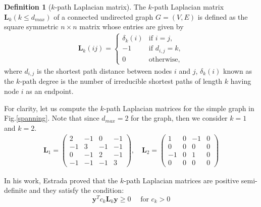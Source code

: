 \documentclass[10pt,a4paper]{article}
\theoremstyle{plain}
\theoremstyle{definition}
\newtheorem{defn}[subsection]{Definition}
\begin{document}
    	    \begin{defn}[$k$-path Laplacian matrix]
    	    	The $k$-path Laplacian matrix $\mathbf{L}_k(k \leq d_{max})$ of a connected undirected graph $G=(V,E)$ is defined as the square symmetric $n \times n$ matrix whose entries are given by
    	    	\begin{eqnarray}
    	    	\mathbf{L}_k(ij) = \begin{cases} 
    	    	\delta_k(i) &\mbox{if } i = j,  \\
    	    	-1 &\mbox{if } d_{i,j} = k, \\
    	    	0 & \text{otherwise},
    	    	\end{cases}
    	    	\end{eqnarray}\label{k-laplacian}
    	    	where $d_{i,j}$ is the shortest path distance between nodes $i$ and $j$, $\delta_{k}(i)$ known as the $k$-path degree is the number of irreducible shortest paths of length $k$ having node $i$ as an endpoint.	
    	    \end{defn}
            For clarity, let us compute the $k$-path Laplacian matrices for the simple graph in Fig.\ref{spanning}. Note that since $d_{max} = 2$ for the graph, then we consider $k=1$ and $k=2$.	
    	    	\begin{eqnarray*}
    	    		\mathbf{L}_1 = \begin{pmatrix}
    	    			2 & -1 & 0 & -1 \\
    	    			-1 & 3 & -1 & -1 \\
    	    			0 & -1 & 2 & -1  \\
    	    			-1 & -1 & -1 & 3
    	    		\end{pmatrix}, \quad
    	    		\mathbf{L}_2 = \begin{pmatrix}
    	    			1 & 0 & -1 & 0 \\
    	    			0 & 0 & 0 & 0 \\
    	    			-1 & 0 & 1 & 0 \\
    	    			0 & 0 & 0 & 0
    	    		\end{pmatrix}
    	    	\end{eqnarray*}
    	    
    	    In his work, Estrada proved that the $k$-path Laplacian matrices are positive semi-definite and they satisfy the condition:
    	    \begin{equation}
    	    \mathbf{y}^Tc_{k}\mathbf{L}_{k}\mathbf{y} \geq 0  \quad \text{ for } c_{k}>0
    	    \label{equatezero}
    	    \end{equation}
    	    
\end{document}
